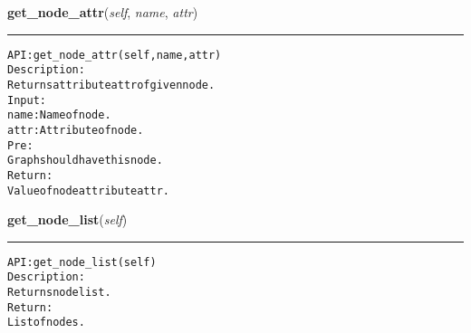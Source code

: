     \label{coinor:gimpy:graph:Graph:get_node_attr}

    \vspace{0.5ex}

\hspace{.8\funcindent}\begin{boxedminipage}{\funcwidth}

    \raggedright \textbf{get\_node\_attr}(\textit{self}, \textit{name}, \textit{attr})

    \vspace{-1.5ex}

    \rule{\textwidth}{0.5\fboxrule}
\setlength{\parskip}{2ex}
\begin{alltt}

API: get\_node\_attr(self, name, attr)
Description:
Returns attribute attr of given node.
Input:
    name: Name of node.
    attr: Attribute of node.
Pre:
    Graph should have this node.
Return:
    Value of node attribute attr.
\end{alltt}

\setlength{\parskip}{1ex}
    \end{boxedminipage}

    \label{coinor:gimpy:graph:Graph:get_node_list}

    \vspace{0.5ex}

\hspace{.8\funcindent}\begin{boxedminipage}{\funcwidth}

    \raggedright \textbf{get\_node\_list}(\textit{self})

    \vspace{-1.5ex}

    \rule{\textwidth}{0.5\fboxrule}
\setlength{\parskip}{2ex}
\begin{alltt}

API: get\_node\_list(self)
Description:
Returns node list.
Return:
    List of nodes.
\end{alltt}

\setlength{\parskip}{1ex}
    \end{boxedminipage}

